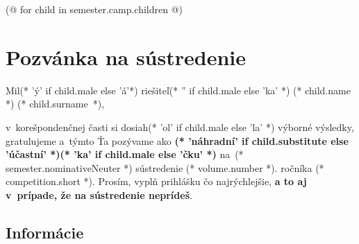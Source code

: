 \documentclass[12pt, twoside]{article}
\begin{document}
    \pagestyle{main-(* competition.id *)}
    
    (@ for child in semester.camp.children @)
    \thispagestyle{first-(* competition.id *)-(* volume.id *)-(* semester.id *)}
    \vspace*{8mm}
    \section{Pozvánka na sústredenie}
        Mil(* 'ý' if child.male else 'á'*) riešiteľ(* '' if child.male else 'ka' *) (* child.name *) (* child.surname *),

        v~korešpondenčnej časti si dosiah(* 'ol' if child.male else 'la' *) výborné výsledky,
        gratulujeme a~týmto Ťa pozývame ako \textbf{(* 'náhradní' if child.substitute else 'účastní' *)(* 'ka' if child.male else 'čku' *)}
        na~(* semester.nominativeNeuter *) sústredenie (* volume.number *). ročníka (* competition.short *).
        Prosím, vyplň prihlášku čo najrýchlejšie, \textbf{a to aj v~prípade, že na sústredenie neprídeš}.

    \subsection{Informácie}
\end{document}
